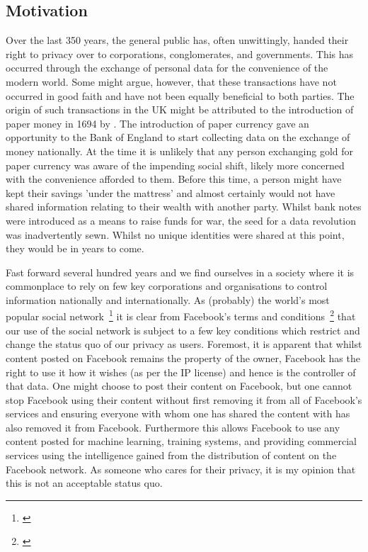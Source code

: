 \subsection{Motivation}

Over the last 350 years, the general public has, often unwittingly, handed their right to privacy over to corporations, conglomerates, and governments. This has occurred through the exchange of personal data for the convenience of the modern world. Some might argue, however, that these transactions have not occurred in good faith and have not been equally beneficial to both parties.
\newline
The origin of such transactions in the UK might be attributed to the introduction of paper money in 1694 by \cite{bankofengland:2016:online}. The introduction of paper currency gave an opportunity to the Bank of England to start collecting data on the exchange of money nationally. At the time it is unlikely that any person exchanging gold for paper currency was aware of the impending social shift, likely more concerned with the convenience afforded to them. Before this time, a person might have kept their savings 'under the mattress' and almost certainly would not have shared information relating to their wealth with another party. Whilst bank notes were introduced as a means to raise funds for war, the seed for a data revolution was inadvertently sewn. Whilst no unique identities were shared at this point, they would be in years to come.

Fast forward several hundred years and we find ourselves in a society where it is commonplace to rely on few key corporations and organisations to control information nationally and internationally. As (probably) the world's most popular social network~\footnote{\cite{worldmapsocialnetworks:2017:online}} it is clear from Facebook's terms and conditions~\footnote{\cite{facebookterms:2015:online}} that our use of the social network is subject to a few key conditions which restrict and change the status quo of our privacy as users. Foremost, it is apparent that whilst content posted on Facebook remains the property of the owner, Facebook has the right to use it how it wishes (as per the IP license) and hence is the controller of that data. One might choose to post their content on Facebook, but one cannot stop Facebook using their content without first removing it from all of Facebook's services and ensuring everyone with whom one has shared the content with has also removed it from Facebook. Furthermore this allows Facebook to use any content posted for machine learning, training systems, and providing commercial services using the intelligence gained from the distribution of content on the Facebook network. As someone who cares for their privacy, it is my opinion that this is not an acceptable status quo.

